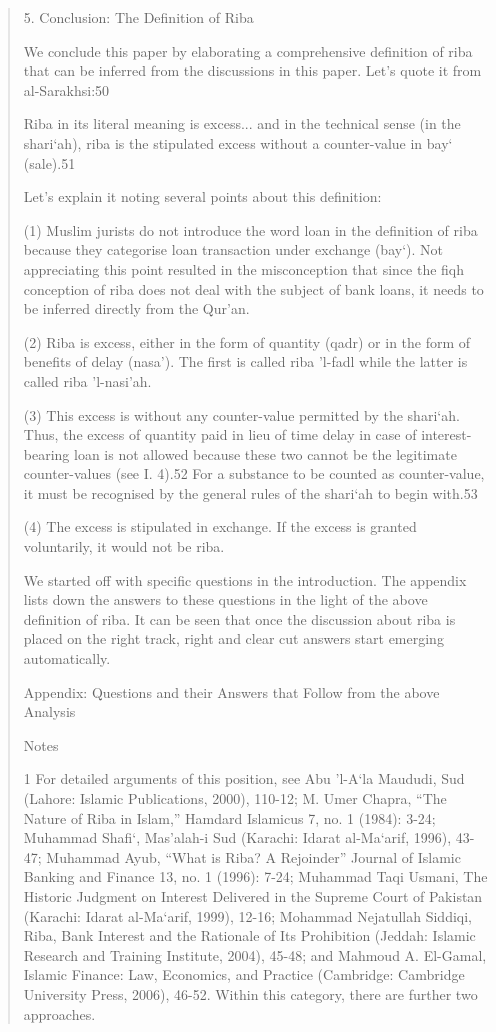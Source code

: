 \begin{quote}
5. Conclusion: The Definition of Riba

We conclude this paper by elaborating a comprehensive definition of riba that can be inferred from the discussions in this paper. Let's quote it from al-Sarakhsi:50

Riba in its literal meaning is excess... and in the technical sense (in the shari‘ah), riba is the stipulated excess without a counter-value in bay‘ (sale).51

Let's explain it noting several points about this definition:

(1) Muslim jurists do not introduce the word loan in the definition of riba because they categorise loan transaction under exchange (bay‘). Not appreciating this point resulted in the misconception that since the fiqh conception of riba does not deal with the subject of bank loans, it needs to be inferred directly from the Qur'an.

(2) Riba is excess, either in the form of quantity (qadr) or in the form of benefits of delay (nasa'). The first is called riba 'l-fadl while the latter is called riba 'l-nasi'ah.

(3) This excess is without any counter-value permitted by the shari‘ah. Thus, the excess of quantity paid in lieu of time delay in case of interest-bearing loan is not allowed because these two cannot be the legitimate counter-values (see I. 4).52 For a substance to be counted as counter-value, it must be recognised by the general rules of the shari‘ah to begin with.53

(4) The excess is stipulated in exchange. If the excess is granted voluntarily, it would not be riba.

We started off with specific questions in the introduction. The appendix lists down the answers to these questions in the light of the above definition of riba. It can be seen that once the discussion about riba is placed on the right track, right and clear cut answers start emerging automatically.

Appendix: Questions and their Answers that Follow from the above Analysis

Notes

1 For detailed arguments of this position, see Abu 'l-A‘la Maududi, Sud (Lahore: Islamic Publications, 2000), 110-12; M. Umer Chapra, “The Nature of Riba in Islam,” Hamdard Islamicus 7, no. 1 (1984): 3-24; Muhammad Shafi‘, Mas'alah-i Sud (Karachi: Idarat al-Ma‘arif, 1996), 43-47; Muhammad Ayub, “What is Riba? A Rejoinder” Journal of Islamic Banking and Finance 13, no. 1 (1996): 7-24; Muhammad Taqi Usmani, The Historic Judgment on Interest Delivered in the Supreme Court of Pakistan (Karachi: Idarat al-Ma‘arif, 1999), 12-16; Mohammad Nejatullah Siddiqi, Riba, Bank Interest and the Rationale of Its Prohibition (Jeddah: Islamic Research and Training Institute, 2004), 45-48; and Mahmoud A. El-Gamal, Islamic Finance: Law, Economics, and Practice (Cambridge: Cambridge University Press, 2006), 46-52. Within this category, there are further two approaches.


\end{quote}
